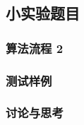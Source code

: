\begin{comment}
    每个模块已经预留了图片模块，如想使用，须使用如下命名方式  
    callback-[lab no]
    test-[lab no]-[pic no], 其中[pic no]用于同节多个图片
\end{comment}

\renewcommand{\labno}{2} %

\subsection{小实验题目}


\subsubsection{算法流程 \labno}

\begin{comment}
\begin{figure}[H]
  \centering
  \texttt{[image: pic/callback-\\detokenize\\expandafter\{\\labno]}.png} 
  \caption{callback for lab \labno}
\end{figure}
\end{comment}




\subsubsection{测试样例}

\begin{comment}
\begin{figure}[H]
  \centering
  \texttt{[image: pic/test-\\detokenize\\expandafter\{\\labno]}.png} 
  \caption{test for lab \labno}
\end{figure}
\end{comment}


\subsubsection{讨论与思考}

\begin{comment}
\begin{figure}[!htbp]
    \vspace{-0.5cm}
    \centering
    \subfigure[  sub_caption1]{
        \texttt{[image: .jpg]}
    }

    \quad %
    \subfigure[sub_cap2]{
        \texttt{[image: 2.jpg]}
    }
    \quad
    \subfigure[sub_cap3]{
        \texttt{[image: 3.jpg]}
    }

    \quad
    \subfigure[sub_cap4]{
        \texttt{[image: 4.jpg]}
    }
    \caption{ caption}
\end{figure}
\end{comment}